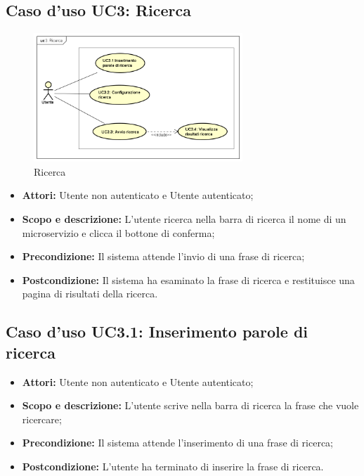 \documentclass[12pt,a4paper,titlepage]{article}
\begin{document}
	\subsection{Caso d'uso UC3: Ricerca}
	\label{UC3}
	\begin{figure}[H]
		\centering
		\includegraphics[width=0.7\textwidth]{UseCase/Ricerca}
		\caption{Ricerca}
	\end{figure}
	\begin{itemize}
		\item \textbf{Attori: }Utente non autenticato e Utente autenticato;
		\item \textbf{Scopo e descrizione: }L'utente ricerca nella barra di ricerca il nome di un microservizio e clicca il bottone di conferma;
		\item \textbf{Precondizione: }Il sistema attende l'invio di una frase di ricerca;
		\item \textbf{Postcondizione: }Il sistema ha esaminato la frase di ricerca e restituisce una pagina di risultati della ricerca.
	\end{itemize}
	\subsection{Caso d'uso UC3.1: Inserimento parole di ricerca}
	\label{UC3.1}
	\begin{itemize}
		\item \textbf{Attori: }Utente non autenticato e Utente autenticato;
		\item \textbf{Scopo e descrizione: }L'utente scrive nella barra di ricerca la frase che vuole ricercare;
		\item \textbf{Precondizione: }Il sistema attende l'inserimento di una frase di ricerca;
		\item \textbf{Postcondizione: }L'utente ha terminato di inserire la frase di ricerca.
	\end{itemize}
\end{document}
